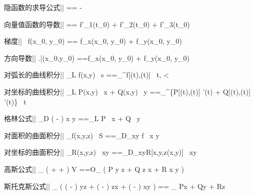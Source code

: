 





隐函数的求导公式||
== -


向量值函数的导数||
== f'_1(t_0) + f'_2(t_0) + f'_3(t_0)


梯度||
 \, f(x_0, y_0)
== f_x(x_0, y_0) + f_y(x_0, y_0)


方向导数||
\left.\right|{(x_0,y_0)}
==f_x(x_0, y_0) \cos\alpha + f_y(x_0, y_0) \cos\beta


对弧长的曲线积分||
\int_L f(x,y) \, s
==\int_\alpha^\beta f[\phi(t),\psi(t)]  \, t, \quad \alpha < \beta


对坐标的曲线积分||
\int_L P(x,y) \, x + Q(x,y) \, y
==\int_\alpha^\beta \left\{P[\phi(t),\psi(t)] \phi'(t) + Q[\phi(t),\psi(t)] \psi'(t)\right\} \, t

格林公式||
\iint_D \left( - \right) x y
==\oint_L P \, x + Q \, y

对面积的曲面积分||
\iint_\Sigma f(x,y,z) \, S
==\iint_{D_{xy}} f\big[x,y,z(x,y)\big]  \, x y

对坐标的曲面积分||
\iint_\Sigma R(x,y,z) \, xy
==\iint_{D_{xy}}R[x,y,z(x,y)] \, xy

高斯公式||
\iiint_{\Omega} \left(  +  +  \right) V
==O\iint_{\Sigma} \left( P y z + Q z x + R x y \right)

斯托克斯公式||
\iint_{\Sigma} \left(
  \left( - \right) yz +
  \left( - \right) zx +
  \left( - \right) xy
\right) == \oint_{\partial \Sigma} Px + Qy + Rz


